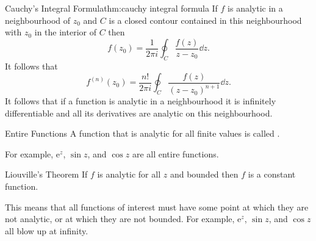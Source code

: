 \documentclass[fleqn]{NotesClass}
\newcommand*{\e}{\mathrm{e}}
\begin{document}
    \begin{thm}{Cauchy's Integral Formula}{thm:cauchy integral formula}
        If \(f\) is analytic in a neighbourhood of \(z_0\) and \(C\) is a closed contour contained in this neighbourhood with \(z_0\) in the interior of \(C\) then
        \begin{equation}
            f(z_0) = \frac{1}{2\pi i} \oint_C \frac{f(z)}{z - z_0}\dd{z}.
        \end{equation}
        It follows that
        \begin{equation}
            f^{(n)}(z_0) = \frac{n!}{2\pi i} \oint_C \frac{f(z)}{(z - z_0)^{n+1}}\dd{z}.
        \end{equation}
        It follows that if a function is analytic in a neighbourhood it is infinitely differentiable and all its derivatives are analytic on this neighbourhood.
    \end{thm}
    
    \begin{dfn}{Entire Functions}{}
        A function that is analytic for all finite values is called .
    \end{dfn}
    
    For example, \(\e^z\), \(\sin z\), and \(\cos z\) are all entire functions.
    
    \begin{thm}{Liouville's Theorem}{}
        If \(f\) is analytic for all \(z\) and bounded then \(f\) is a constant function.
    \end{thm}

    This means that all functions of interest must have some point at which they are not analytic, or at which they are not bounded.
    For example, \(\e^z\), \(\sin z\), and \(\cos z\) all blow up at infinity.
    
\end{document}

